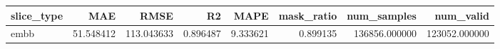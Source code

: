 \begin{tabular}{lrrrrrrr}
\toprule
slice_type & MAE & RMSE & R2 & MAPE & mask_ratio & num_samples & num_valid \\
\midrule
embb & 51.548412 & 113.043633 & 0.896487 & 9.333621 & 0.899135 & 136856.000000 & 123052.000000 \\
\bottomrule
\end{tabular}
